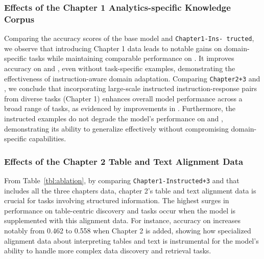 \subsubsection{Effects of the Chapter 1 Analytics-specific Knowledge Corpus} 
Comparing the accuracy scores of the base model and  \texttt{Chapter1{\footnotesize -Ins- tructed}}, we observe that introducing Chapter 1 data leads to notable gains on domain-specific tasks while maintaining comparable performance on \mmlu. It improves accuracy on \datadiscovery and \texttosql, even without task-specific examples, demonstrating the effectiveness of instruction-aware domain adaptation. 
Comparing \texttt{Chapter2+3} and \modelname, we conclude that incorporating large-scale instructed instruction-response pairs from diverse tasks (Chapter 1) enhances overall model performance across a broad range of tasks, as evidenced by improvements in \mmlu. Furthermore, the instructed examples do not degrade the model’s performance on \datadiscovery and \texttosql, demonstrating its ability to generalize effectively without compromising domain-specific capabilities.


\subsubsection{Effects of the Chapter 2 Table and Text Alignment Data}
From Table~\ref{tbl:ablation}, by comparing \texttt{Chapter1{\footnotesize -Instructed}+3} and \modelname that includes all the three chapters data, chapter 2's table and text alignment data is crucial for tasks involving structured information. The highest surges in performance on table-centric discovery and \texttosql tasks occur when the model is supplemented with this alignment data. For instance, accuracy on \wikipage increases notably from 0.462 to 0.558 when Chapter 2 is added, showing how specialized alignment data about interpreting tables and text is instrumental for the model’s ability to handle more complex data discovery and retrieval tasks.
%
